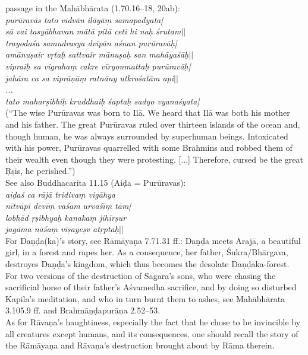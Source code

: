 \documentclass{article}
\begin{document}
passage in the Mahābhārata (1.70.16--18, 20ab): \\ \textit{purūravās tato vidvān ilāyāṃ samapadyata|\\ sā vai tasyābhavan mātā pitā ceti hi naḥ śrutam$||$\\ trayodaśa samudrasya dvīpān aśnan purūravāḥ|\\ amānuṣair vṛtaḥ sattvair mānuṣaḥ san mahāyaśāḥ$||$\\ vipraiḥ sa vigrahaṃ cakre vīryonmattaḥ purūravāḥ|\\ jahāra ca sa viprāṇāṃ ratnāny utkrośatām api$||$\\ ... \\ tato maharṣibhiḥ kruddhaiḥ śaptaḥ sadyo vyanaśyata|} \\ (``The wise Purūravas was born to Ilā. We heard that Ilā was both his mother and his father. The great Purūravas ruled over thirteen islands of the ocean and, though human, he was always surrounded by superhuman beings. Intoxicated with his power, Purūravas quarrelled with some Brahmins and robbed them of their wealth even though they were protesting. [...] Therefore, cursed be the great Ṛṣis, he perished.'') \\ See also Buddhacarita 11.15 (Aiḍa = Purūravas):\\ \textit{ aiḍaś ca rājā tridivaṃ vigāhya\\ nītvāpi devīṃ vaśam urvaśīṃ tām|\\ lobhād ṛṣibhyaḥ kanakaṃ jihīrṣur \\ jagāma nāśaṃ viṣayeṣv atṛptaḥ$||$} \\ For Daṇḍa(ka)'s story, see Rāmāyaṇa 7.71.31 ff.: Daṇḍa meets Arajā, a beautiful girl, in a forest and rapes her. As a consequence, her father, Śukra/Bhārgava, destroyes Daṇḍa's kingdom, which thus becomes the desolate Daṇḍaka-forest.  \\For two versions of the destruction of Sagara's sons, who were chasing the sacrificial horse of their father's Aśvamedha sacrifice, and by doing so disturbed Kapila's meditation, and who in turn burnt them to ashes, see Mahābhārata 3.105.9 ff. and Brahmāṇḍapurāṇa 2.52--53. \\ As for Rāvaṇa's haughtiness, especially the fact that he chose to be invincible by all creatures except humans, and its consequences, one should recall the story of the Rāmāyaṇa and Rāvaṇa's destruction brought about by Rāma therein.
\end{document}
